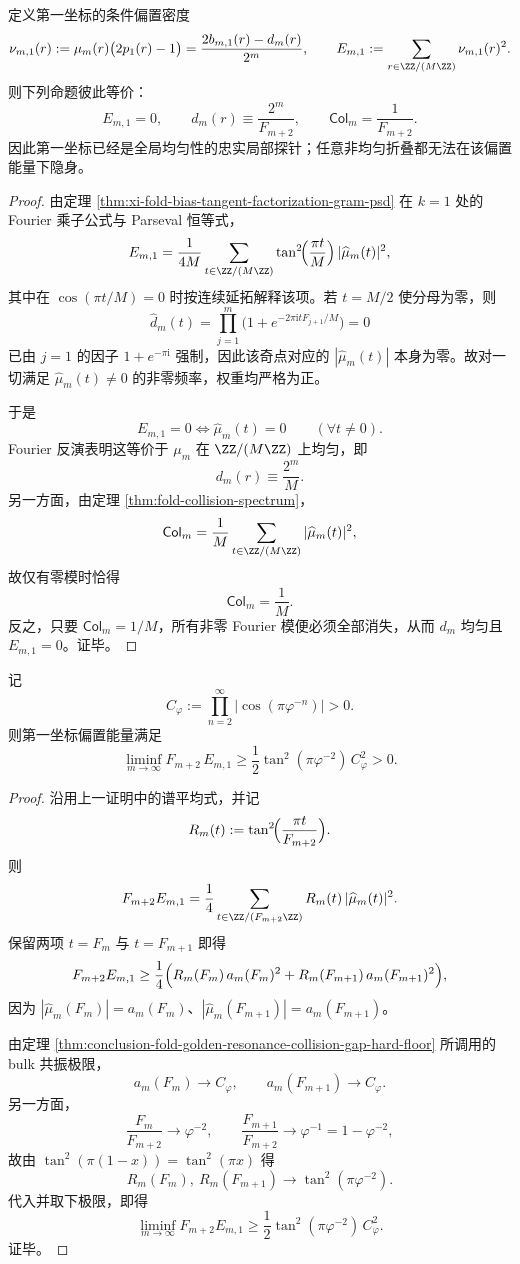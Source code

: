 \begin{theorem}[第一坐标偏置能量的谱忠实性]\label{thm:conclusion-first-coordinate-bias-energy-spectral-faithfulness}
定义第一坐标的条件偏置密度
\[
\nu_{m,1}(r):=\mu_m(r)\bigl(2p_1(r)-1\bigr)
=
\frac{2b_{m,1}(r)-d_m(r)}{2^m},
\qquad
E_{m,1}:=\sum_{r\in\ZZ/(M\ZZ)}\nu_{m,1}(r)^2.
\]
则下列命题彼此等价：
\[
E_{m,1}=0,
\qquad
d_m(r)\equiv \frac{2^m}{F_{m+2}},
\qquad
\mathsf{Col}_m=\frac{1}{F_{m+2}}.
\]
因此第一坐标已经是全局均匀性的忠实局部探针；任意非均匀折叠都无法在该偏置能量下隐身。
\end{theorem}
\begin{proof}
由定理 \ref{thm:xi-fold-bias-tangent-factorization-gram-psd} 在 \(k=1\) 处的 Fourier 乘子公式与 Parseval 恒等式，
\[
E_{m,1}
=
\frac{1}{4M}
\sum_{t\in\ZZ/(M\ZZ)}
\tan^2\!\Bigl(\frac{\pi t}{M}\Bigr)\,
|\widehat\mu_m(t)|^2,
\]
其中在 \(\cos(\pi t/M)=0\) 时按连续延拓解释该项。若 \(t=M/2\) 使分母为零，则
\[
\widehat d_m(t)=\prod_{j=1}^{m}\bigl(1+e^{-2\pi \mathrm{i}tF_{j+1}/M}\bigr)=0
\]
已由 \(j=1\) 的因子 \(1+e^{-\pi \mathrm{i}}\) 强制，因此该奇点对应的 \(|\widehat\mu_m(t)|\) 本身为零。故对一切满足 \(\widehat\mu_m(t)\neq 0\) 的非零频率，权重均严格为正。

于是
\[
E_{m,1}=0
\iff
\widehat\mu_m(t)=0\qquad(\forall t\neq 0).
\]
Fourier 反演表明这等价于 \(\mu_m\) 在 \(\ZZ/(M\ZZ)\) 上均匀，即
\[
d_m(r)\equiv \frac{2^m}{M}.
\]
另一方面，由定理 \ref{thm:fold-collision-spectrum}，
\[
\mathsf{Col}_m
=
\frac{1}{M}\sum_{t\in\ZZ/(M\ZZ)}|\widehat\mu_m(t)|^2,
\]
故仅有零模时恰得
\[
\mathsf{Col}_m=\frac{1}{M}.
\]
反之，只要 \(\mathsf{Col}_m=1/M\)，所有非零 Fourier 模便必须全部消失，从而 \(d_m\) 均匀且 \(E_{m,1}=0\)。证毕。
\end{proof}

\begin{theorem}[第一坐标偏置能量的共振硬下界]\label{thm:conclusion-first-coordinate-bias-energy-resonant-hard-floor}
记
\[
C_\varphi:=\prod_{n=2}^{\infty}\bigl|\cos(\pi\varphi^{-n})\bigr|>0.
\]
则第一坐标偏置能量满足
\[
\liminf_{m\to\infty}F_{m+2}\,E_{m,1}
\ge
\frac12\tan^2(\pi\varphi^{-2})\,C_\varphi^2
>0.
\]
\end{theorem}
\begin{proof}
沿用上一证明中的谱平均式，并记
\[
R_m(t):=\tan^2\!\Bigl(\frac{\pi t}{F_{m+2}}\Bigr).
\]
则
\[
F_{m+2}E_{m,1}
=
\frac14\sum_{t\in\ZZ/(F_{m+2}\ZZ)}R_m(t)\,|\widehat\mu_m(t)|^2.
\]
保留两项 \(t=F_m\) 与 \(t=F_{m+1}\) 即得
\[
F_{m+2}E_{m,1}
\ge
\frac14\Bigl(
R_m(F_m)\,a_m(F_m)^2
+
R_m(F_{m+1})\,a_m(F_{m+1})^2
\Bigr),
\]
因为 \(|\widehat\mu_m(F_m)|=a_m(F_m)\)、\(|\widehat\mu_m(F_{m+1})|=a_m(F_{m+1})\)。

由定理 \ref{thm:conclusion-fold-golden-resonance-collision-gap-hard-floor} 所调用的 bulk 共振极限，
\[
a_m(F_m)\longrightarrow C_\varphi,
\qquad
a_m(F_{m+1})\longrightarrow C_\varphi.
\]
另一方面，
\[
\frac{F_m}{F_{m+2}}\longrightarrow \varphi^{-2},
\qquad
\frac{F_{m+1}}{F_{m+2}}\longrightarrow \varphi^{-1}=1-\varphi^{-2},
\]
故由 \(\tan^2(\pi(1-x))=\tan^2(\pi x)\) 得
\[
R_m(F_m),\ R_m(F_{m+1})\longrightarrow \tan^2(\pi\varphi^{-2}).
\]
代入并取下极限，即得
\[
\liminf_{m\to\infty}F_{m+2}E_{m,1}
\ge
\frac12\tan^2(\pi\varphi^{-2})\,C_\varphi^2.
\]
证毕。
\end{proof}

